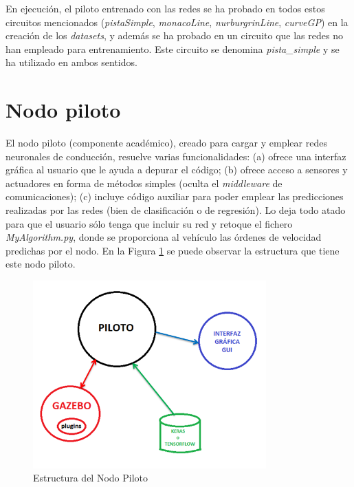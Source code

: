En ejecución, el piloto entrenado con las redes se ha probado en todos estos circuitos mencionados (\textit{pistaSimple}, \textit{monacoLine}, \textit{nurburgrinLine}, \textit{curveGP}) en la creación de los \textit{datasets}, y además se ha probado en un circuito que las redes no han empleado para entrenamiento. Este circuito se denomina \textit{pista\_simple} y se ha utilizado en ambos sentidos.


\section{Nodo piloto}

El nodo piloto (componente académico), creado para cargar y emplear redes neuronales de conducción, resuelve varias funcionalidades: (a) ofrece una interfaz gráfica al usuario que le ayuda a depurar el código; (b) ofrece acceso a sensores y actuadores en forma de métodos simples (oculta el \textit{middleware} de comunicaciones); (c) incluye código auxiliar para poder emplear las predicciones realizadas por las redes (bien de clasificación o de regresión). Lo deja todo atado para que el usuario sólo tenga que incluir su red y retoque el fichero \textit{MyAlgorithm.py}, donde se proporciona al vehículo las órdenes de velocidad predichas por el nodo. En la Figura \ref{fig.nodo_piloto} se puede observar la estructura que tiene este nodo piloto.\\

\begin{figure}
  \begin{center}
    \includegraphics[width=0.8\textwidth]{figures/Infraestructura/nodo_piloto.png}
		\caption{Estructura del Nodo Piloto}
		\label{fig.nodo_piloto}
		\end{center}
\end{figure}


